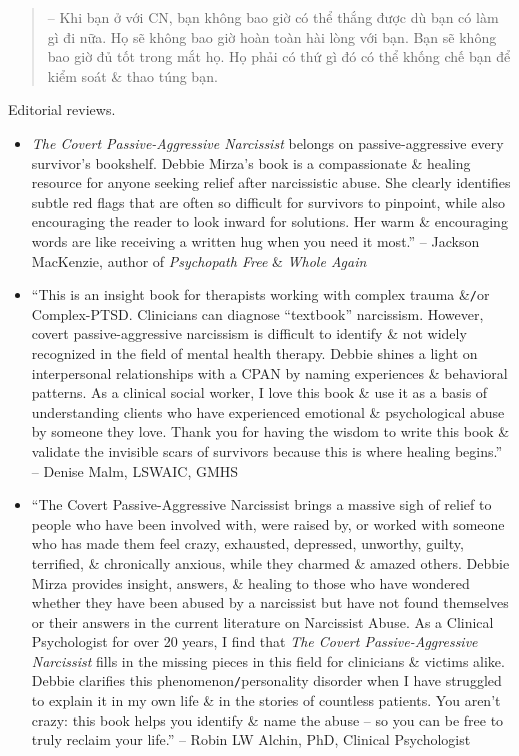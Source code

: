 \documentclass{article}
\begin{document}
\begin{enumerate}
\begin{quotation}
		-- Khi bạn ở với CN, bạn không bao giờ có thể thắng được dù bạn có làm gì đi nữa. Họ sẽ không bao giờ hoàn toàn hài lòng với bạn. Bạn sẽ không bao giờ đủ tốt trong mắt họ. Họ phải có thứ gì đó có thể khống chế bạn để kiểm soát \& thao túng bạn.
	\end{quotation}
	{\sf Editorial reviews.}
	\begin{itemize}
		\item {\it The Covert Passive-Aggressive Narcissist} belongs on passive-aggressive every survivor's bookshelf. {\sc Debbie Mirza}'s book is a compassionate \& healing resource for anyone seeking relief after narcissistic abuse. She clearly identifies subtle red flags that are often so difficult for survivors to pinpoint, while also encouraging the reader to look inward for solutions. Her warm \& encouraging words are like receiving a written hug when you need it most.'' -- {\sc Jackson MacKenzie}, author of {\it Psychopath Free} \& {\it Whole Again}
		\item ``This is an insight book for therapists working with complex trauma \&{\tt/}or Complex-PTSD. Clinicians can diagnose ``textbook'' narcissism. However, covert passive-aggressive narcissism is difficult to identify \& not widely recognized in the field of mental health therapy. {\sc Debbie} shines a light on interpersonal relationships with a CPAN by naming experiences \& behavioral patterns. As a clinical social worker, I love this book \& use it as a basis of understanding clients who have experienced emotional \& psychological abuse by someone they love. Thank you for having the wisdom to write this book \& validate the invisible scars of survivors because this is where healing begins.'' -- {\sc Denise Malm}, LSWAIC, GMHS
		\item ``The Covert Passive-Aggressive Narcissist brings a massive sigh of relief to people who have been involved with, were raised by, or worked with someone who has made them feel crazy, exhausted, depressed, unworthy, guilty, terrified, \& chronically anxious, while they charmed \& amazed others. {\sc Debbie Mirza} provides insight, answers, \& healing to those who have wondered whether they have been abused by a narcissist but have not found themselves or their answers in the current literature on Narcissist Abuse. As a Clinical Psychologist for over 20 years, I find that {\it The Covert Passive-Aggressive Narcissist} fills in the missing pieces in this field for clinicians \& victims alike. {\sc Debbie} clarifies this phenomenon{\tt/}personality disorder when I have struggled to explain it in my own life \& in the stories of countless patients. You aren't crazy: this book helps you identify \& name the abuse -- so you can be free to truly reclaim your life.'' -- {\sc Robin LW Alchin}, PhD, Clinical Psychologist

\end{itemize}
\end{enumerate}
\end{document}
